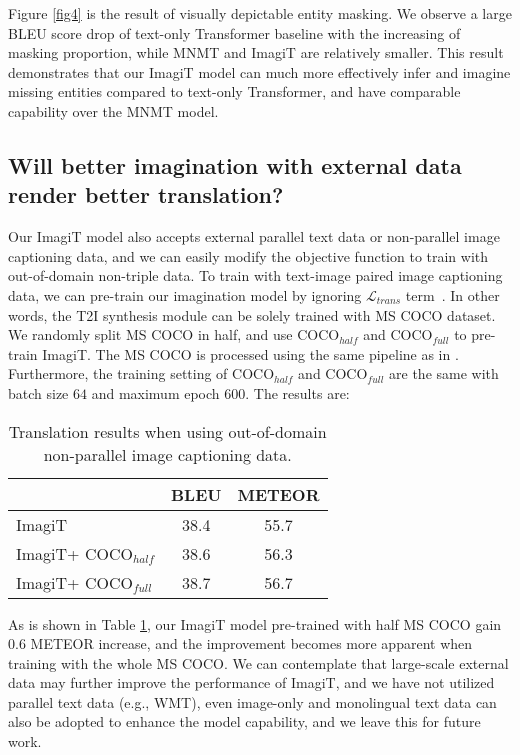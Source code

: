 \documentclass[11pt]{article}
\newcommand{\method}{ImagiT\xspace}
\begin{document}
Figure \ref{fig4} is the result of visually depictable entity masking. We observe a large BLEU score drop of text-only Transformer baseline with the increasing of masking proportion, while MNMT and \method are relatively smaller. This result demonstrates that our \method model can much more effectively infer and imagine missing entities compared to text-only Transformer, and have comparable capability over the MNMT model.

\subsection{Will better imagination with external data render better translation?}

Our \method model also accepts external parallel text data or non-parallel image captioning data, and we can easily modify the objective function to train with out-of-domain non-triple data. To train with text-image paired image captioning data, we can pre-train our imagination model by ignoring $\mathcal{L}_{trans}$ term~\cite{yang2020towards}. In other words, the T2I synthesis module can be solely trained with MS COCO dataset. We randomly split MS COCO in half, and use COCO$_{half}$ and COCO$_{full}$ to pre-train \method. The MS COCO is processed using the same pipeline as in \citet{zhang2017stackgan}. Furthermore, the training setting of COCO$_{half}$ and COCO$_{full}$ are the same with batch size $64$ and maximum epoch $600$. The results are:

\begin{table}[!h]
\centering
\begin{tabular}{l|cc}
\hline
              & BLEU     & METEOR    \\ \hline
\method & 38.4  & 55.7 \\ \hline
\method + COCO$_{half}$& 38.6 & 56.3 \\ \hline
\method + COCO$_{full}$& 38.7 & 56.7 \\
\hline
\end{tabular}
\caption{Translation results when using out-of-domain non-parallel image captioning data.}
\label{table3}
\end{table}

As is shown in Table \ref{table3}, our \method model pre-trained with half MS COCO gain 0.6 METEOR increase, and the improvement becomes more apparent when training with the whole MS COCO. We can contemplate that large-scale external data may further improve the performance of \method, and we have not utilized parallel text data (e.g., WMT), even image-only and monolingual text data can also be adopted to enhance the model capability, and we leave this for future work. 
\end{document}
